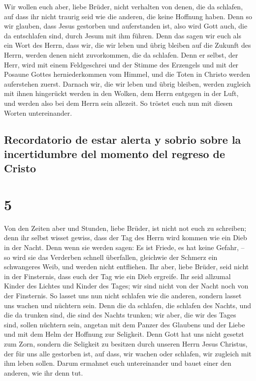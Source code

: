  Wir wollen euch aber, liebe Brüder, nicht verhalten von
denen, die da schlafen, auf dass ihr nicht traurig seid wie die anderen,
die keine Hoffnung haben.  Denn so wir glauben, dass
Jesus gestorben und auferstanden ist, also wird Gott auch, die da
entschlafen sind, durch Jesum mit ihm führen.  Denn das
sagen wir euch als ein Wort des Herrn, dass wir, die wir leben und übrig
bleiben auf die Zukunft des Herrn, werden denen nicht zuvorkommen, die
da schlafen.  Denn er selbst, der Herr, wird mit einem
Feldgeschrei und der Stimme des Erzengels und mit der Posaune Gottes
herniederkommen vom Himmel, und die Toten in Christo werden auferstehen
zuerst.  Darnach wir, die wir leben und übrig bleiben,
werden zugleich mit ihnen hingerückt werden in den Wolken, dem Herrn
entgegen in der Luft, und werden also bei dem Herrn sein allezeit.
 So tröstet euch nun mit diesen Worten untereinander.

\hypertarget{recordatorio-de-estar-alerta-y-sobrio-sobre-la-incertidumbre-del-momento-del-regreso-de-cristo}{%
\subsection{Recordatorio de estar alerta y sobrio sobre la incertidumbre
del momento del regreso de
Cristo}\label{recordatorio-de-estar-alerta-y-sobrio-sobre-la-incertidumbre-del-momento-del-regreso-de-cristo}}

\hypertarget{section-4}{%
\section{5}\label{section-4}}

 Von den Zeiten aber und Stunden, liebe Brüder, ist nicht
not euch zu schreiben;  denn ihr selbst wisset gewiss,
dass der Tag des Herrn wird kommen wie ein Dieb in der Nacht.
 Denn wenn sie werden sagen: Es ist Friede, es hat keine
Gefahr, -- so wird sie das Verderben schnell überfallen, gleichwie der
Schmerz ein schwangeres Weib, und werden nicht entfliehen.
 Ihr aber, liebe Brüder, seid nicht in der Finsternis,
dass euch der Tag wie ein Dieb ergreife.  Ihr seid
allzumal Kinder des Lichtes und Kinder des Tages; wir sind nicht von der
Nacht noch von der Finsternis.  So lasset uns nun nicht
schlafen wie die anderen, sondern lasset uns wachen und nüchtern sein.
 Denn die da schlafen, die schlafen des Nachts, und die da
trunken sind, die sind des Nachts trunken;  wir aber, die
wir des Tages sind, sollen nüchtern sein, angetan mit dem Panzer des
Glaubens und der Liebe und mit dem Helm der Hoffnung zur Seligkeit.
 Denn Gott hat uns nicht gesetzt zum Zorn, sondern die
Seligkeit zu besitzen durch unseren Herrn Jesus Christus,
 der für uns alle gestorben ist, auf dass, wir wachen
oder schlafen, wir zugleich mit ihm leben sollen.  Darum
ermahnet euch untereinander und bauet einer den anderen, wie ihr denn
tut.

